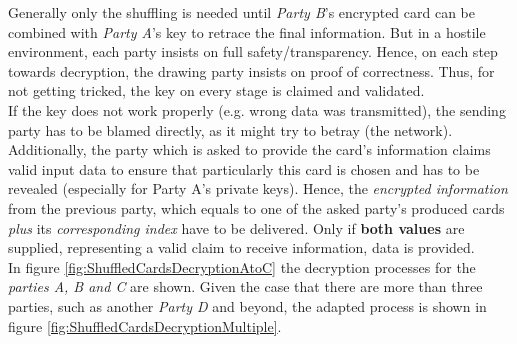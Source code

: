 Generally only the shuffling is needed until \textit{Party B}'s encrypted card can be combined with \textit{Party A}'s key to retrace the final information.
But in a hostile environment, each party insists on full safety/transparency.
Hence, on each step towards decryption, the drawing party insists on proof of correctness.
Thus, for not getting tricked, the key on every stage is claimed and validated. \\
If the key does not work properly (e.g. wrong data was transmitted),
the sending party has to be blamed directly, as it might try to betray (the network).
Additionally, the party which is asked to provide the card's information claims valid input data to ensure that
particularly this card is chosen and has to be revealed (especially for Party A's private keys).
Hence, the \textit{encrypted information} from the previous party,
which equals to one of the asked party's produced cards \textit{plus} its \textit{corresponding index} have to be delivered.
Only if \textbf{both values} are supplied, representing a valid claim to receive information, data is provided. \\
In figure \ref{fig:ShuffledCardsDecryptionAtoC} the decryption processes for the \textit{parties A, B and C} are shown.
Given the case that there are more than three parties, such as another \textit{Party D} and beyond, the adapted process is shown in figure \ref{fig:ShuffledCardsDecryptionMultiple}.
